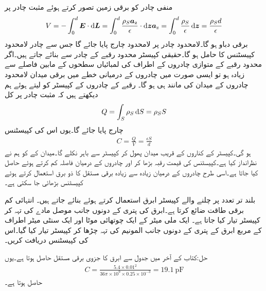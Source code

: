 منفی چادر کو برقی زمین تصور کرتے ہوئے مثبت چادر پر
\begin{align*}
V=-\int_0^d \kvec{E} \cdot \dif \kvec{L}=\int_0^d \frac{\rho_S \az}{\epsilon} \cdot \dif \kvec{z} \az=\int_0^d \frac{\rho_S }{\epsilon}  \dif \kvec{z}=\frac{\rho_S d}{\epsilon}
\end{align*}
برقی دباو ہو گا۔لامحدود چادر پر لامحدود چارج پایا جائے گا جس سے چادر لامحدود کپیسٹنس کا حامل ہو گا۔حقیقی کپیسٹر محدود رقبے کے چادر سے بنائے جاتے ہیں۔اگر محدود رقبے کے متوازی چادروں کے اطراف کی لمبائیاں سطحوں کے مابین فاصلے سے زیادہ ہو تو ایسی صورت میں چادروں کے درمیانی خطے میں برقی میدان  لامحدود چادروں کے میدان کی مانند ہی ہو گا۔  رقبے کے چادروں کے کپیسٹر کو لیتے ہوئے ہم دیکھتے ہیں کہ مثبت چادر پر کل
\begin{align*}
Q=\int_S \rho_S \dif S=\rho_S S
\end{align*}
چارج پایا جائے  گا۔یوں اس کی کپیسٹنس
\begin{align}
C=\frac{Q}{V}=\frac{\epsilon S}{d}
\end{align}
ہو گی۔کپیسٹر کے کناروں کے قریب میدان پھول کر کپیسٹر سے باہر نکلے گا۔میدان کے  کو ہم نے نظرانداز کیا ہے۔کپیسٹنس کی قیمت رقبہ بڑھا کر اور چادروں کے درمیان فاصلہ کم کرتے ہوئے حاصل کیا جاتا ہے۔اسی طرح چادروں کے درمیان زیادہ سے زیادہ برقی مستقل کا ذو برق استعمال کرتے ہوئے کپیسٹنس بڑھائی جا سکتی ہے۔

بلند تر تعدد پر چلنے والے کپیسٹر ابرق استعمال کرتے ہوئے بنائے جاتے ہیں۔ انتہائی کم برقی طاقت ضائع کرتا ہے۔ابرق کی پتری کے دونوں جانب موصل مادے کی تہہ  کر کپیسٹر تیار کیا جاتا ہے۔
ایک ملی میٹر کے ایک چوتھائی موٹا اور ایک سنٹی میٹر اطراف کے مربع ابرق کے پتری کے دونوں جانب المونیم کی تہہ چڑھا کر کپیسٹر تیار کیا گیا۔اس کی کپیسٹنس دریافت کریں۔

حل:کتاب کے آخر میں جدول  سے ابرق کا جزوی برقی مستقل  حاصل ہوتا ہے۔یوں
\begin{align*}
C=\frac{5.4 \times 0.01^2}{36 \pi \times 10^9 \times 0.25 \times 10^{-3}}=\SI{19.1}{\pico \farad}
\end{align*}
حاصل ہوتا ہے۔

